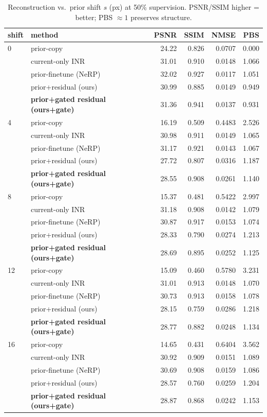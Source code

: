 \documentclass[11pt]{article}
\begin{document}
\begin{table}[H]\centering
\caption{Reconstruction vs.\ prior shift $s$ (px) at 50\% supervision. PSNR/SSIM higher = better; PBS $\approx1$ preserves structure.}
\begin{tabular}{llrrrr}\toprule
shift & method & PSNR & SSIM & NMSE & PBS \\ \midrule
0 & prior-copy & 24.22 & 0.826 & 0.0707 & 0.000 \\
 & current-only INR & 31.01 & 0.910 & 0.0148 & 1.066 \\
 & prior-finetune (NeRP) & 32.02 & 0.927 & 0.0117 & 1.051 \\
 & prior+residual (ours) & 30.99 & 0.885 & 0.0149 & 0.949 \\
 & \textbf{prior+gated residual (ours+gate)} & 31.36 & 0.941 & 0.0137 & 0.931 \\
\midrule
4 & prior-copy & 16.19 & 0.509 & 0.4483 & 2.526 \\
 & current-only INR & 30.98 & 0.911 & 0.0149 & 1.065 \\
 & prior-finetune (NeRP) & 31.17 & 0.921 & 0.0143 & 1.067 \\
 & prior+residual (ours) & 27.72 & 0.807 & 0.0316 & 1.187 \\
 & \textbf{prior+gated residual (ours+gate)} & 28.55 & 0.908 & 0.0261 & 1.140 \\
\midrule
8 & prior-copy & 15.37 & 0.481 & 0.5422 & 2.997 \\
 & current-only INR & 31.18 & 0.908 & 0.0142 & 1.079 \\
 & prior-finetune (NeRP) & 30.87 & 0.917 & 0.0153 & 1.074 \\
 & prior+residual (ours) & 28.33 & 0.790 & 0.0274 & 1.213 \\
 & \textbf{prior+gated residual (ours+gate)} & 28.69 & 0.895 & 0.0252 & 1.125 \\
\midrule
12 & prior-copy & 15.09 & 0.460 & 0.5780 & 3.231 \\
 & current-only INR & 31.01 & 0.913 & 0.0148 & 1.070 \\
 & prior-finetune (NeRP) & 30.73 & 0.913 & 0.0158 & 1.078 \\
 & prior+residual (ours) & 28.15 & 0.759 & 0.0286 & 1.218 \\
 & \textbf{prior+gated residual (ours+gate)} & 28.77 & 0.882 & 0.0248 & 1.134 \\
\midrule
16 & prior-copy & 14.65 & 0.431 & 0.6404 & 3.562 \\
 & current-only INR & 30.92 & 0.909 & 0.0151 & 1.089 \\
 & prior-finetune (NeRP) & 30.69 & 0.908 & 0.0159 & 1.086 \\
 & prior+residual (ours) & 28.57 & 0.760 & 0.0259 & 1.204 \\
 & \textbf{prior+gated residual (ours+gate)} & 28.87 & 0.868 & 0.0242 & 1.153 \\
\bottomrule\end{tabular}\end{table}
\end{document}
